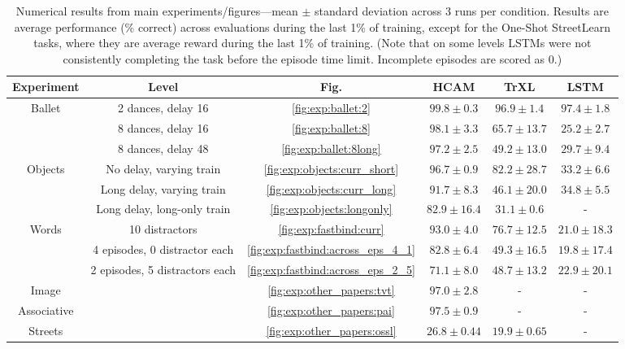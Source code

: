 \begin{table}[htb]
    \centering
    \caption{Numerical results from main experiments/figures---mean \(\pm\) standard deviation across 3 runs per condition. Results are average performance (\% correct) across evaluations during the last 1\% of training, except for the One-Shot StreetLearn tasks, where they are average reward during the last 1\% of training. (Note that on some levels LSTMs were not consistently completing the task before the episode time limit. Incomplete episodes are scored as 0.)} \label{tab:app:numericalresults}
    \begin{tabular}{cccccc}
      Experiment & Level & Fig. & HCAM & TrXL & LSTM\\ \hline
      \multirow{3}{*}{Ballet} & 2 dances, delay 16 & \ref{fig:exp:ballet:2} & \(99.8 \pm 0.3\) & \(96.9 \pm 1.4\) & \(97.4 \pm 1.8\) \\
      & 8 dances, delay 16 &\ref{fig:exp:ballet:8} & \(98.1 \pm 3.3\)  & \(65.7 \pm 13.7\) & \(25.2\pm 2.7\) \\
      & 8 dances, delay 48 &\ref{fig:exp:ballet:8long} & \(97.2 \pm 2.5\) & \(49.2 \pm 13.0\) & \(29.7 \pm 9.4\)\\ \hline
      \multirow{3}{*}{Objects} & No delay, varying train & \ref{fig:exp:objects:curr_short} & \(96.7\pm 0.9\) & \(82.2 \pm 28.7\) & \(33.2 \pm 6.6\) \\
      & Long delay, varying train & \ref{fig:exp:objects:curr_long}  & \(91.7\pm 8.3\) & \(46.1 \pm 20.0\) & \(34.8 \pm 5.5\) \\
      & Long delay, long-only train & \ref{fig:exp:objects:longonly} & \(82.9\pm 16.4\) & \(31.1 \pm 0.6\) & - \\\hline
      \multirow{3}{*}{Words} & 10 distractors & \ref{fig:exp:fastbind:curr} & \(93.0 \pm 4.0\) & \(76.7 \pm 12.5\) & \(21.0 \pm 18.3\) \\
      & 4 episodes, 0 distractor each &  \ref{fig:exp:fastbind:across_eps_4_1}& \(82.8\pm 6.4\) & \(49.3 \pm 16.5\) & \(19.8 \pm 17.4\)  \\
      & 2 episodes, 5 distractors each &  \ref{fig:exp:fastbind:across_eps_2_5}& \(71.1\pm 8.0\) & \(48.7 \pm 13.2\) & \(22.9 \pm 20.1\)\\\hline
      Image & &  \ref{fig:exp:other_papers:tvt} & \(97.0\pm 2.8\) & - & - \\\hline
      Associative & &\ref{fig:exp:other_papers:pai}  & \(97.5\pm 0.9\) & - & - \\\hline
      Streets & & \ref{fig:exp:other_papers:ossl} & \(26.8\pm 0.44\) &  \(19.9\pm 0.65\) & - \\\hline
    \end{tabular}
\end{table}

